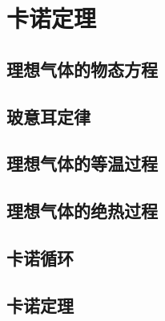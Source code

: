 \chapter{卡诺定理}

\section{理想气体的物态方程}

\section{玻意耳定律}

\section{理想气体的等温过程}

\section{理想气体的绝热过程}

\section{卡诺循环}

\section{卡诺定理}

